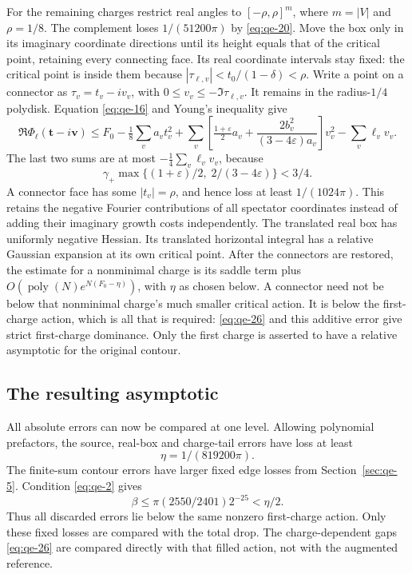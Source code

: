 For the remaining charges restrict real angles to
\([-\rho,\rho]^m\), where $m=|V|$ and \(\rho=1/8\). The complement loses
\(1/(51200\pi)\) by \eqref{eq:qe-20}. Move the box only in its
imaginary coordinate directions until its height equals that of the
critical point, retaining every connecting face. Its real coordinate
intervals stay fixed: the critical point is inside them because
$|\tau_{\ell,v}|<t_0/(1-\delta)<\rho$. Write a point on a
connector as \(\tau_v=t_v-i v_v\), with
\(0\le v_v\le-\Im\tau_{\ell,v}\). It remains in the radius-\(1/4\)
polydisk. Equation \eqref{eq:qe-16} and Young's inequality give
\begin{equation}
\Re\Phi_\ell(\mathbf t-i\mathbf v)\le
 F_0-\tfrac18\sum_va_vt_v^2+
 \sum_v\left[\tfrac{1+\varepsilon}{2}a_v+
       \frac{2b_v^2}{(3-4\varepsilon)a_v}\right]v_v^2
                                      -\sum_v\ell_vv_v.
\label{eq:qe-32}
\end{equation}
The last two sums are at most \(-\tfrac14\sum_v\ell_vv_v\), because
\begin{equation}
\gamma_+\max\{(1+\varepsilon)/2,\;2/(3-4\varepsilon)\}<3/4.
\label{eq:qe-33}
\end{equation}
A connector face has some \(|t_v|=\rho\), and hence loss at least \(1/(1024\pi)\). This retains the negative Fourier contributions of all spectator coordinates instead of adding their imaginary growth costs independently. The translated real box has uniformly negative Hessian. Its translated horizontal integral has a relative Gaussian expansion at its own critical point. After the connectors are restored, the estimate for a nonminimal charge is its saddle term plus \(O(\operatorname{poly}(N)e^{N(F_0-\eta)})\), with \(\eta\) as chosen below. A connector need not be below that nonminimal charge's much smaller critical action. It is below the first-charge action, which is all that is required: \eqref{eq:qe-26} and this additive error give strict first-charge dominance. Only the first charge is asserted to have a relative asymptotic for the original contour.

\subsection{The resulting asymptotic}\label{sec:qe-9}

All absolute errors can now be compared at one level. Allowing
polynomial prefactors, the source, real-box and charge-tail errors
have loss at least
\begin{equation}
\eta=1/(819200\pi).
\label{eq:qe-34}
\end{equation}
The finite-sum contour errors have larger fixed edge losses from Section~\ref{sec:qe-5}. Condition \eqref{eq:qe-2} gives
\begin{equation}
\beta\le\pi(2550/2401)2^{-25}<\eta/2.
\label{eq:qe-35}
\end{equation}
Thus all discarded errors lie below the same nonzero first-charge action. Only these fixed losses are compared with the total drop. The charge-dependent gaps \eqref{eq:qe-26} are compared directly with that filled action, not with the augmented reference.

